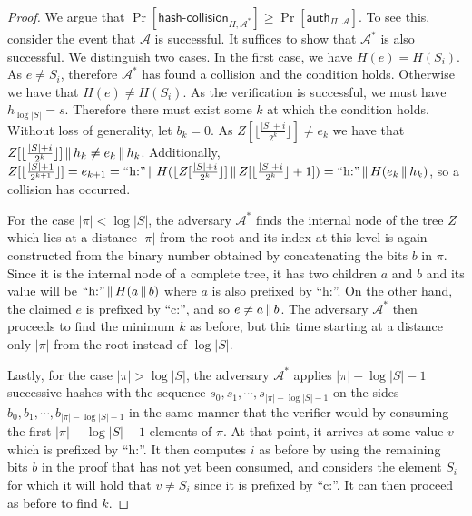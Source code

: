 \begin{proof}
We argue that
$\Pr[\textsf{hash-collision}_{H,\mathcal{A}^*}] \geq
 \Pr[\textsf{auth}_{\Pi,\mathcal{A}}]$. To see this, consider the event that
$\mathcal{A}$ is successful. It suffices to show that $\mathcal{A}^*$ is also
successful. We distinguish two cases. In the first case,
we have $H(e) = H(S_i)$. As $e \neq S_i$, therefore $\mathcal{A}^*$ has
found a collision and the condition holds. Otherwise we have that
$H(e) \neq H(S_i)$. As the verification is successful, we must have $h_{\log|S|} = s$.
Therefore there must exist some $k$ at which the condition holds. Without loss
of generality, let $b_k = 0$.
As $Z[\lfloor \frac{|S| + i}{2^k} \rfloor] \neq e_k$ we have that
$Z[\lfloor \frac{|S| + i}{2^k} \rfloor] \,\|\, h_k \neq e_k \,\|\, h_k$.
Additionally,
$Z[\lfloor \frac{|S| + 1}{2^{k + 1}} \rfloor] = e_{k + 1} = \text{``h:''} \,\|\, H(\lfloor Z[\frac{|S| + i}{2^k} \rfloor] \,\|\, Z[\lfloor \frac{|S| + i}{2^k} \rfloor + 1]) = \text{``h:''} \,\|\, H(e_k \,\|\, h_k)$,
so a collision has occurred.

For the case $|\pi| < \log|S|$, the adversary $\mathcal{A}^*$ finds the
internal node of the tree $Z$ which lies at a distance $|\pi|$ from the root and
its index at this level is again constructed from the binary number obtained
by concatenating the bits $b$ in $\pi$. Since it is the internal node of a
complete tree, it has two children $a$ and $b$ and its value will be
$\text{``h:''} \,\|\, H(a \,\|\, b)$ where $a$ is also prefixed by ``h:''. On
the other hand, the claimed $e$ is prefixed by ``c:'', and so $e \neq a
\,\|\, b$. The adversary $\mathcal{A}^*$ then proceeds to find the minimum
$k$ as before, but this time starting at a distance only $|\pi|$ from the root
instead of $\log|S|$.

Lastly, for the case $|\pi| > \log|S|$, the adversary
$\mathcal{A}^*$ applies $|\pi| - \log|S| - 1$ successive hashes with the sequence
$s_0,\allowbreak s_1,\allowbreak \cdots,\allowbreak s_{|\pi| - \log|S| - 1}$
on the sides
$b_0,\allowbreak b_1,\allowbreak \cdots,\allowbreak b_{|\pi| - \log|S| - 1}$
in the same manner that the verifier
would by consuming the first $|\pi| - \log|S| - 1$ elements of $\pi$. At that
point, it arrives at some value $v$ which is prefixed by ``h:''. It then
computes $i$ as before by using the remaining bits $b$ in the proof that has not
yet been consumed, and considers the element $S_i$ for which it will hold that
$v \neq S_i$ since it is prefixed by ``c:''. It can then proceed as before to
find $k$.
\end{proof}

